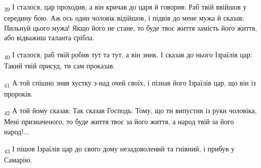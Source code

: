 \begin{tcolorbox}
\textsubscript{39} І сталося, цар проходив, а він кричав до царя й говорив: Раб твій ввійшов у середину бою. Аж ось один чоловік відійшов, і підвів до мене мужа й сказав: Пильнуй цього мужа! Якщо його не стане, то буде твоє життя замість його життя, або відважиш таланта срібла.
\end{tcolorbox}
\begin{tcolorbox}
\textsubscript{40} І сталося, раб твій робив тут та тут, а він зник. І сказав до нього Ізраїлів цар: Такий твій присуд, ти сам проказав.
\end{tcolorbox}
\begin{tcolorbox}
\textsubscript{41} А той спішно зняв хустку з-над очей своїх, і пізнав його Ізраїлів цар, що він із пророків.
\end{tcolorbox}
\begin{tcolorbox}
\textsubscript{42} А той йому сказав: Так сказав Господь: Тому, що ти випустив із руки чоловіка, Мені призначеного, то буде життя твоє за його життя, а народ твій за його народ!...
\end{tcolorbox}
\begin{tcolorbox}
\textsubscript{43} І пішов Ізраїлів цар до свого дому незадоволений та гнівний, і прибув у Самарію.
\end{tcolorbox}
